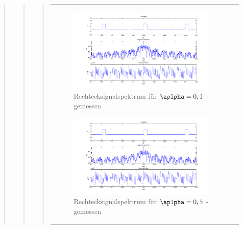 \begin{quote}
\begin{quote}
\begin{quote}
\begin{center}
\begin{tabular}{ll}
\begin{minipage}{0.6\textwidth}
                
                \end{minipage}

                \begin{minipage}{0.6\textwidth}

                    \begin{figure}[H]
                        \label{fig:}            
                        \includegraphics[scale=0.3]{./Bilder/recht_alpha1_-_gemessen.png} %
                        \caption{Rechtecksignalspektrum für $\aplpha = 0,1$ - gemessen}
                    \end{figure}                
                    
                    \begin{figure}[H]
                        \label{fig:}            
                        \includegraphics[scale=0.3]{./Bilder/recht_alpha1_-_gemessen.png} %
                        \caption{Rechtecksignalspektrum für $\aplpha = 0,5$ - gemessen}
                    \end{figure}                


\end{minipage}
\end{tabular}
\end{center}
\end{quote}
\end{quote}
\end{quote}
